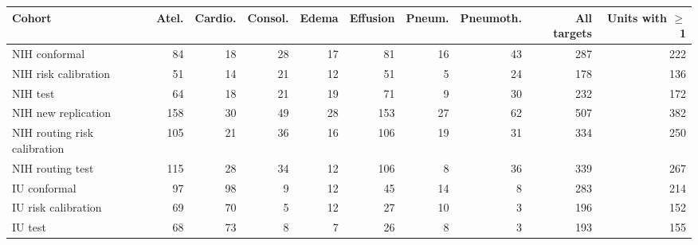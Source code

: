 \begin{center}\small\setlength{\tabcolsep}{2.5pt}
\begin{tabular}{lrrrrrrrrr}\toprule
Cohort & Atel. & Cardio. & Consol. & Edema & Effusion & Pneum. & Pneumoth. & All targets & Units with $\geq$1\\\midrule
NIH conformal & 84 & 18 & 28 & 17 & 81 & 16 & 43 & 287 & 222\\
NIH risk calibration & 51 & 14 & 21 & 12 & 51 & 5 & 24 & 178 & 136\\
NIH test & 64 & 18 & 21 & 19 & 71 & 9 & 30 & 232 & 172\\
NIH new replication & 158 & 30 & 49 & 28 & 153 & 27 & 62 & 507 & 382\\
NIH routing risk calibration & 105 & 21 & 36 & 16 & 106 & 19 & 31 & 334 & 250\\
NIH routing test & 115 & 28 & 34 & 12 & 106 & 8 & 36 & 339 & 267\\
IU conformal & 97 & 98 & 9 & 12 & 45 & 14 & 8 & 283 & 214\\
IU risk calibration & 69 & 70 & 5 & 12 & 27 & 10 & 3 & 196 & 152\\
IU test & 68 & 73 & 8 & 7 & 26 & 8 & 3 & 193 & 155\\
\bottomrule\end{tabular}\end{center}
